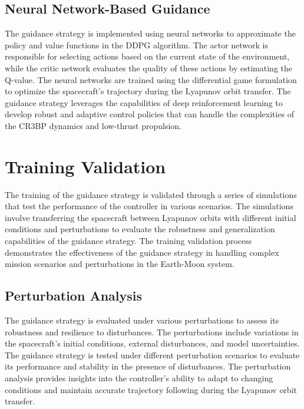 \documentclass[conference]{IEEEtran}
\begin{document}
\subsection{Neural Network-Based Guidance}
The guidance strategy is implemented using neural networks to approximate the policy and value functions in the DDPG algorithm. The actor network is responsible for selecting actions based on the current state of the environment, while the critic network evaluates the quality of these actions by estimating the Q-value. The neural networks are trained using the differential game formulation to optimize the spacecraft's trajectory during the Lyapunov orbit transfer. The guidance strategy leverages the capabilities of deep reinforcement learning to develop robust and adaptive control policies that can handle the complexities of the CR3BP dynamics and low-thrust propulsion.


% 
% 






\section{Training Validation}
The training of the guidance strategy is validated through a series of simulations that test the performance of the controller in various scenarios. The simulations involve transferring the spacecraft between Lyapunov orbits with different initial conditions and perturbations to evaluate the robustness and generalization capabilities of the guidance strategy. The training validation process demonstrates the effectiveness of the guidance strategy in handling complex mission scenarios and perturbations in the Earth-Moon system.	
\subsection{Perturbation Analysis}
The guidance strategy is evaluated under various perturbations to assess its robustness and resilience to disturbances. The perturbations include variations in the spacecraft's initial conditions, external disturbances, and model uncertainties. The guidance strategy is tested under different perturbation scenarios to evaluate its performance and stability in the presence of disturbances. The perturbation analysis provides insights into the controller's ability to adapt to changing conditions and maintain accurate trajectory following during the Lyapunov orbit transfer.
\end{document}
